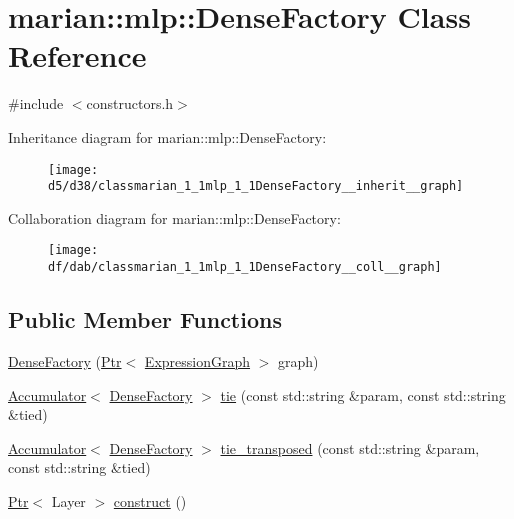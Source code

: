 \hypertarget{classmarian_1_1mlp_1_1DenseFactory}{}\section{marian\+:\+:mlp\+:\+:Dense\+Factory Class Reference}
\label{classmarian_1_1mlp_1_1DenseFactory}


{\ttfamily \#include $<$constructors.\+h$>$}



Inheritance diagram for marian\+:\+:mlp\+:\+:Dense\+Factory\+:
\nopagebreak
\begin{figure}[H]
\begin{center}
\leavevmode
\texttt{[image: d5/d38/classmarian\_1\_1mlp\_1\_1DenseFactory\_\_inherit\_\_graph]}
\end{center}
\end{figure}


Collaboration diagram for marian\+:\+:mlp\+:\+:Dense\+Factory\+:
\nopagebreak
\begin{figure}[H]
\begin{center}
\leavevmode
\texttt{[image: df/dab/classmarian\_1\_1mlp\_1\_1DenseFactory\_\_coll\_\_graph]}
\end{center}
\end{figure}
\subsection*{Public Member Functions}
\begin{DoxyCompactItemize}
\item 
\hyperlink{classmarian_1_1mlp_1_1DenseFactory_a6c805ca4dc86a997010dd9058696f28d}{Dense\+Factory} (\hyperlink{namespacemarian_ad1a373be43a00ef9ce35666145137b08}{Ptr}$<$ \hyperlink{classmarian_1_1ExpressionGraph}{Expression\+Graph} $>$ graph)
\item 
\hyperlink{classmarian_1_1Accumulator}{Accumulator}$<$ \hyperlink{classmarian_1_1mlp_1_1DenseFactory}{Dense\+Factory} $>$ \hyperlink{classmarian_1_1mlp_1_1DenseFactory_a73aeebf237e26e01cd58f80bf3ba20be}{tie} (const std\+::string \&param, const std\+::string \&tied)
\item 
\hyperlink{classmarian_1_1Accumulator}{Accumulator}$<$ \hyperlink{classmarian_1_1mlp_1_1DenseFactory}{Dense\+Factory} $>$ \hyperlink{classmarian_1_1mlp_1_1DenseFactory_aed7d02fe20bf0bf9de28564fd5e363ae}{tie\+\_\+transposed} (const std\+::string \&param, const std\+::string \&tied)
\item 
\hyperlink{namespacemarian_ad1a373be43a00ef9ce35666145137b08}{Ptr}$<$ Layer $>$ \hyperlink{classmarian_1_1mlp_1_1DenseFactory_a8f8ed567ae10a6fc455667b7f180378f}{construct} ()
\end{DoxyCompactItemize}

